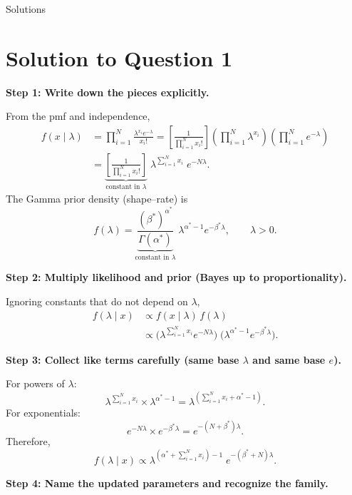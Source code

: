 \documentclass[12pt]{article}
\begin{document}
\newpage

\begin{center}
{\Large Solutions}\\[2pt]
\end{center}

\section*{Solution to Question 1}

\textbf{Step 1: Write down the pieces explicitly.}

From the pmf and independence,
\[
\begin{aligned}
f(x \mid \lambda)
&=\prod_{i=1}^N \frac{\lambda^{x_i} e^{-\lambda}}{x_i!}
= \left[\frac{1}{\prod_{i=1}^N x_i!}\right]
\left(\prod_{i=1}^N \lambda^{x_i}\right)
\left(\prod_{i=1}^N e^{-\lambda}\right) \\
&= \underbrace{\left[\frac{1}{\prod_{i=1}^N x_i!}\right]}_{\text{constant in }\lambda}\;
\lambda^{\sum_{i=1}^N x_i}\; e^{-N\lambda}.
\end{aligned}
\]
The Gamma prior density (shape--rate) is
\[
f(\lambda)=\underbrace{\frac{(\beta^*)^{\alpha^*}}{\Gamma(\alpha^*)}}_{\text{constant in }\lambda}\;
\lambda^{\alpha^*-1} e^{-\beta^* \lambda},\qquad \lambda>0.
\]

\textbf{Step 2: Multiply likelihood and prior (Bayes up to proportionality).}

Ignoring constants that do not depend on $\lambda$,
\[
\begin{aligned}
f(\lambda \mid x) &\propto f(x\mid \lambda)\,f(\lambda) \\
&\propto \Big(\lambda^{\sum_{i=1}^N x_i} e^{-N\lambda}\Big)\;
\Big(\lambda^{\alpha^*-1} e^{-\beta^* \lambda}\Big).
\end{aligned}
\]

\textbf{Step 3: Collect like terms carefully (same base $\lambda$ and same base $e$).}

For powers of $\lambda$:
\[
\lambda^{\sum_{i=1}^N x_i}\times \lambda^{\alpha^*-1}
= \lambda^{\left(\sum_{i=1}^N x_i + \alpha^* - 1\right)}.
\]
For exponentials:
\[
e^{-N\lambda}\times e^{-\beta^*\lambda}=e^{-(N+\beta^*)\lambda}.
\]
Therefore,
\[
f(\lambda \mid x) \propto \lambda^{\left(\alpha^*+\sum_{i=1}^N x_i\right)-1}\; e^{-(\beta^*+N)\lambda}.
\]

\textbf{Step 4: Name the updated parameters and recognize the family.}
\end{document}

